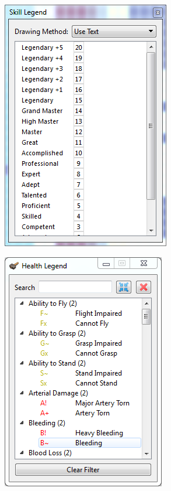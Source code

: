 \documentclass[]{article}
\begin{document}
\begin{figure}[h!]
        \centering
        \begin{subfigure}[C]{0.5\linewidth}
                \centering
                \includegraphics[width=.75\textwidth]{Sec1Fig16-4}
        \end{subfigure}
        \begin{subfigure}[C]{0.45\linewidth}
                \centering
                \includegraphics[width=.8\textwidth]{Sec1Fig16-3}

\end{subfigure}
\end{figure}
\end{document}

